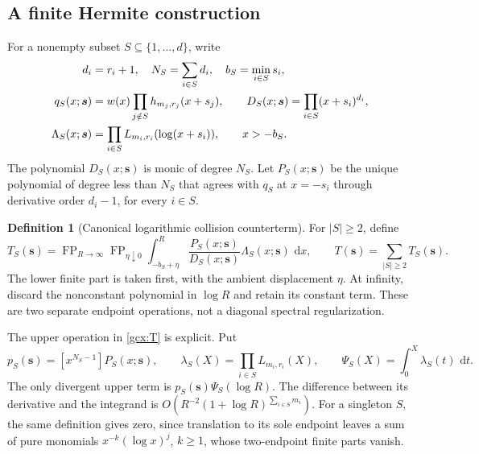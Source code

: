 \documentclass[11pt]{article}
\numberwithin{equation}{section}
\theoremstyle{plain}
\theoremstyle{definition}
\newtheorem{definition}[theorem]{Definition}
\theoremstyle{remark}
\DeclareMathOperator{\FP}{FP}
\newcommand{\dd}{\,\mathrm d}
\begin{document}
\subsection{A finite Hermite construction}

For a nonempty subset $S\subseteq\{1,\ldots,d\}$, write
\begin{align}
 d_i&=r_i+1,\quad N_S=\sum_{i\in S}d_i,\quad
 b_S=\min_{i\in S}s_i,\notag\\
 q_S(x;\boldsymbol s)&=w(x)\prod_{j\notin S}h_{m_j,r_j}(x+s_j),
 \qquad
 D_S(x;\boldsymbol s)=\prod_{i\in S}(x+s_i)^{d_i},
 \label{gcx:qD}\\
 \Lambda_S(x;\boldsymbol s)&=
              \prod_{i\in S}L_{m_i,r_i}(\log(x+s_i)),
 \qquad x>-b_S.
 \label{gcx:Lambda}
\end{align}
The polynomial $D_S(x;\boldsymbol s)$ is monic of degree $N_S$.  Let $P_S(x;\boldsymbol s)$ be the unique polynomial of degree
less than $N_S$ that agrees with $q_S$ at $x=-s_i$ through derivative
order $d_i-1$, for every $i\in S$.

\begin{definition}[Canonical logarithmic collision counterterm]
\label{gcx:counterterm-definition}
For $|S|\ge2$, define
\begin{equation}\label{gcx:T}
 T_S(\boldsymbol s)=\FP_{R\to\infty}\FP_{\eta\downarrow0}
 \int_{-b_S+\eta}^{R}
       \frac{P_S(x;\boldsymbol s)}{D_S(x;\boldsymbol s)}
                  \Lambda_S(x;\boldsymbol s)\,\dd x,
 \qquad
 T(\boldsymbol s)=\sum_{|S|\ge2}T_S(\boldsymbol s).
\end{equation}
The lower finite part is taken first, with the ambient displacement
$\eta$.  At infinity, discard the nonconstant polynomial in $\log R$
and retain its constant term.  These are two separate endpoint
operations, not a diagonal spectral regularization.
\end{definition}

The upper operation in \eqref{gcx:T} is explicit.  Put
\[
 p_S(\boldsymbol s)=[x^{N_S-1}]P_S(x;\boldsymbol s),\qquad
 \lambda_S(X)=\prod_{i\in S}L_{m_i,r_i}(X),\qquad
 \Psi_S(X)=\int_0^X\lambda_S(t)\,\dd t.
\]
The only divergent upper term is
$p_S(\boldsymbol s)\Psi_S(\log R)$.  The difference between its derivative
and the integrand is $O(R^{-2}(1+\log R)^{\sum_{i\in S}m_i})$.
For a singleton $S$, the same definition gives zero, since translation
to its sole endpoint leaves a sum of pure monomials
$x^{-k}(\log x)^j$, $k\ge1$, whose two-endpoint finite parts vanish.
\end{document}
